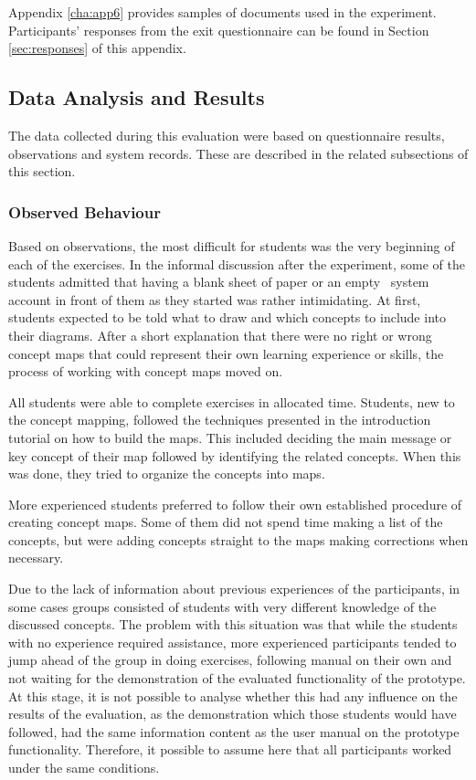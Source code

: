 Appendix \ref{cha:app6} provides samples of documents used in the experiment.
Participants' responses from the exit questionnaire can be found in Section
\ref{sec:responses} of this appendix.

\subsection{Data Analysis and Results}

The data collected during this evaluation were based on questionnaire results,
observations and system records. These are described in the related subsections
of this section.

\subsubsection{Observed Behaviour}

Based on observations, the most difficult for students was the very beginning of
each of the exercises. In the informal discussion after the experiment, some
of the students admitted that having a blank sheet of paper or an empty
\ep~system account in front of them as they started was rather intimidating. At
first, students expected to be told what to draw and which concepts to include
into their diagrams. After a short explanation that there were no right or wrong
concept maps that could represent their own learning experience or skills, the
process of working with concept maps moved on.

All students were able to complete exercises in allocated time. Students, new to
the concept mapping, followed the techniques presented in the introduction
tutorial on how to build the maps. This included deciding the main message or
key concept of their map followed by identifying the related concepts. When this
was done, they tried to organize the concepts into maps.


More experienced students preferred to follow their own established procedure of
creating concept maps. Some of them did not spend time making a list of the
concepts, but were adding concepts straight to the maps making corrections when
necessary.

Due to the lack of information about previous experiences of the participants,
in some cases groups consisted of students with very different knowledge of the
discussed concepts. The problem with this situation was that while the students
with no experience required assistance, more experienced participants tended to
jump ahead of the group in doing exercises, following manual on their own and
not waiting for the demonstration of the evaluated functionality of the
prototype. At this stage, it is not possible to analyse whether this had any
influence on the results of the evaluation, as the demonstration which those
students would have followed, had the same information content as the user
manual on the prototype functionality. Therefore, it possible to assume here
that all participants worked under the same conditions.

